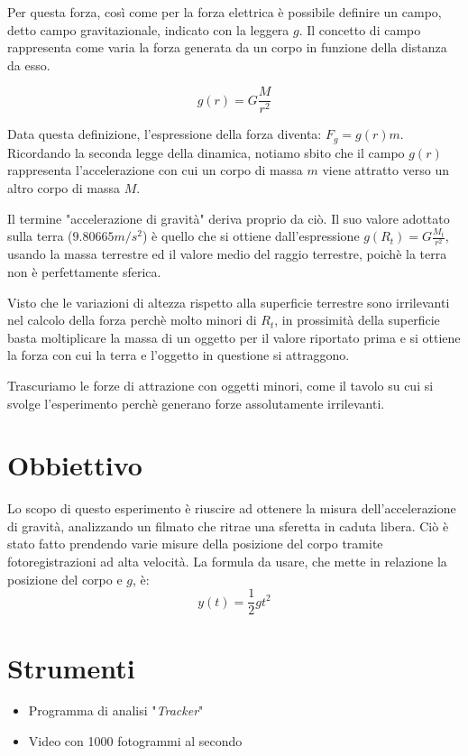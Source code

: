 \documentclass[12pt, a4paper]{article}
\begin{document}
Per questa forza, così come per la forza elettrica è possibile definire un campo, detto campo gravitazionale, indicato con la leggera $g$. 
Il concetto di campo rappresenta come varia la forza generata da un corpo in funzione della distanza da esso. 

\begin{equation}
    g(r) = G\frac{M}{r^2}
\end{equation}

Data questa definizione, l'espressione della forza diventa: $F_g = g(r) m$. 
Ricordando la seconda legge della dinamica, notiamo sbito che il campo $g(r)$ rappresenta l'accelerazione con cui un corpo di massa $m$ viene attratto verso un altro corpo di massa $M$. 

Il termine "accelerazione di gravità" deriva proprio da ciò. Il suo valore adottato sulla terra ($9.80665m/s^2$) è quello che si ottiene dall'espressione $g(R_t) = G\frac{M_t}{r^2}$, usando la massa terrestre ed il valore medio del raggio terrestre, poichè la terra non è perfettamente sferica. 

Visto che le variazioni di altezza rispetto alla superficie terrestre sono irrilevanti nel calcolo della forza perchè molto minori di $R_t$, in prossimità della superficie basta moltiplicare la massa di un oggetto per il valore riportato prima e si ottiene la forza con cui la terra e l'oggetto in questione si attraggono. 

Trascuriamo le forze di attrazione con oggetti minori, come il tavolo su cui si svolge l'esperimento perchè generano forze assolutamente irrilevanti.



\section{Obbiettivo}
\label{sezione obbiettivi}
Lo scopo di questo esperimento è riuscire ad ottenere la misura dell'accelerazione di gravità, analizzando un filmato che ritrae una sferetta in caduta libera. 
Ciò è stato fatto prendendo varie misure della posizione del corpo tramite fotoregistrazioni ad alta velocità. 
La formula da usare, che mette in relazione la posizione del corpo e $g$, è:
\begin{equation*}
    y(t) = \frac{1}{2}gt^2
\end{equation*}



\section{Strumenti}
\begin{itemize}
\setlength\itemsep{0mm}
    \item Programma di analisi "\textit{Tracker}"
    \item Video con 1000 fotogrammi al secondo
\end{itemize}
\end{document}

